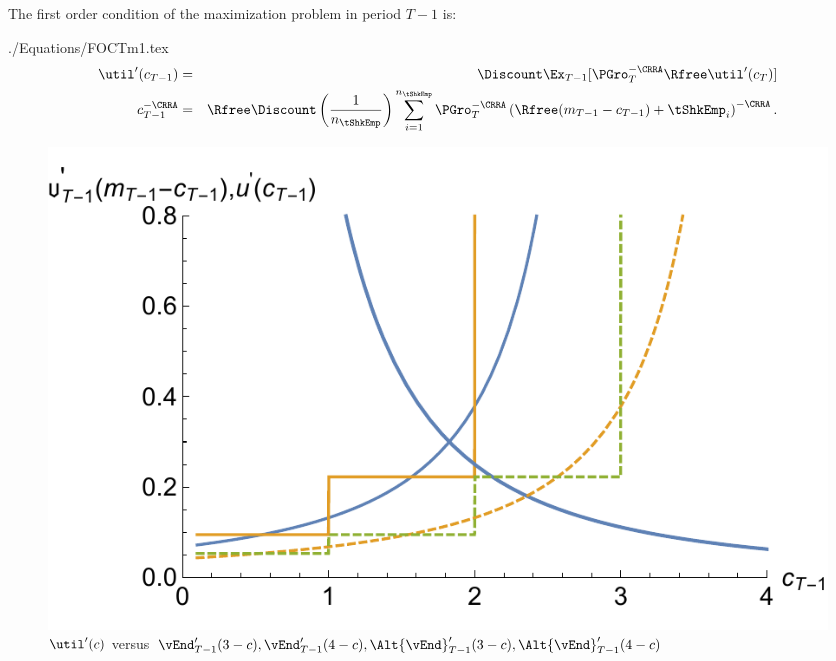 \documentclass[titlepage]{\econtex}
\begin{document}
The first order condition of the maximization problem in period $T-1$ is:
\begin{verbatimwrite}{./Equations/FOCTm1.tex}
  \begin{eqnarray}
    \util^{\prime}({c}_{T-1})      & = & \Discount \Ex_{T-1} [\PGro_{T}^{-\CRRA}\Rfree \util^{\prime}({c}_{T})]  \label{eq:focraw}
    \\      {c}_{T-1}^{-\CRRA}  & = & \Rfree \Discount \left(\frac{1}{n_{\tShkEmp}}\right) \sum_{i=1}^{n_{\tShkEmp}} \PGro_{T}^{-\CRRA}\left(\Rfree ({m}_{T-1}-{c}_{T-1}) + \tShkEmp_{i}\right)^{-\CRRA} \label{eq:FOCTm1}.
  \end{eqnarray}
\end{verbatimwrite}

\hypertarget{PlotuPrimeVSOPrime}{}
\begin{figure}
  \includegraphics{./Figures/PlotuPrimeVSOPrime}
  \caption{$\util^{\prime}(c)$ versus $\vEnd_{T-1}^{\prime}(3-c), \vEnd_{T-1}^{\prime}(4-c), \Alt{\vEnd}_{T-1}^{\prime}(3-c), \Alt{\vEnd}_{T-1}^{\prime}(4-c)$}
  \label{fig:PlotuPrimeVSOPrime}
\end{figure}
\end{document}
